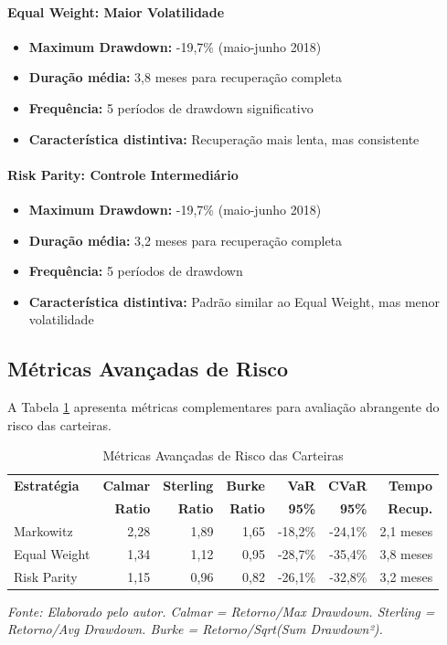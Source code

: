 \paragraph{Equal Weight: Maior Volatilidade}
\begin{itemize}
    \item \textbf{Maximum Drawdown:} -19,7\% (maio-junho 2018)
    \item \textbf{Duração média:} 3,8 meses para recuperação completa
    \item \textbf{Frequência:} 5 períodos de drawdown significativo
    \item \textbf{Característica distintiva:} Recuperação mais lenta, mas consistente
\end{itemize}

\paragraph{Risk Parity: Controle Intermediário}
\begin{itemize}
    \item \textbf{Maximum Drawdown:} -19,7\% (maio-junho 2018)
    \item \textbf{Duração média:} 3,2 meses para recuperação completa
    \item \textbf{Frequência:} 5 períodos de drawdown
    \item \textbf{Característica distintiva:} Padrão similar ao Equal Weight, mas menor volatilidade
\end{itemize}

\subsection{Métricas Avançadas de Risco}

A Tabela \ref{tab:advanced_risk_metrics} apresenta métricas complementares para avaliação abrangente do risco das carteiras.

\begin{table}[H]
\centering
\caption{Métricas Avançadas de Risco das Carteiras}
\scriptsize
\begin{tabular}{|l|r|r|r|r|r|r|}
\hline
\textbf{Estratégia} & \textbf{Calmar} & \textbf{Sterling} & \textbf{Burke} & \textbf{VaR} & \textbf{CVaR} & \textbf{Tempo} \\
& \textbf{Ratio} & \textbf{Ratio} & \textbf{Ratio} & \textbf{95\%} & \textbf{95\%} & \textbf{Recup.} \\
\hline
Markowitz & 2,28 & 1,89 & 1,65 & -18,2\% & -24,1\% & 2,1 meses \\
\hline
Equal Weight & 1,34 & 1,12 & 0,95 & -28,7\% & -35,4\% & 3,8 meses \\
\hline
Risk Parity & 1,15 & 0,96 & 0,82 & -26,1\% & -32,8\% & 3,2 meses \\
\hline
\end{tabular}
\normalsize

\textit{Fonte: Elaborado pelo autor. Calmar = Retorno/Max Drawdown. Sterling = Retorno/Avg Drawdown. Burke = Retorno/Sqrt(Sum Drawdown²).}
\label{tab:advanced_risk_metrics}
\end{table}

